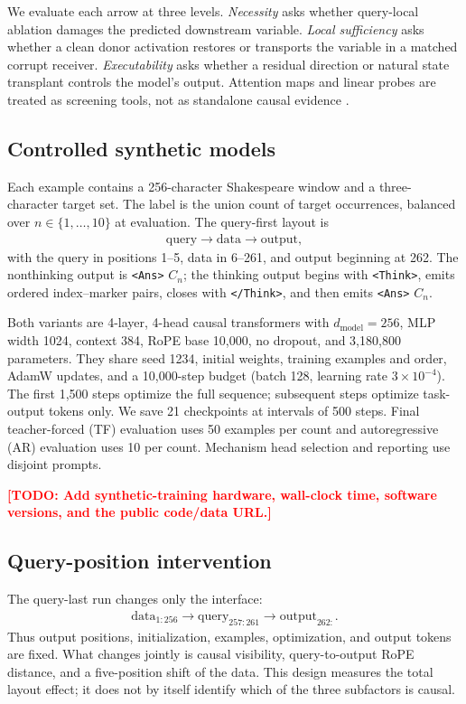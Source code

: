 \documentclass[11pt]{article}
\newcommand{\todo}[1]{\textcolor{red}{\textbf{[TODO: #1]}}}
\newcommand{\ans}{\texttt{<Ans>}}
\newcommand{\think}{\texttt{<Think>}}
\newcommand{\close}{\texttt{</Think>}}
\begin{document}
We evaluate each arrow at three levels. \emph{Necessity} asks whether query-local ablation damages the predicted downstream variable. \emph{Local sufficiency} asks whether a clean donor activation restores or transports the variable in a matched corrupt receiver. \emph{Executability} asks whether a residual direction or natural state transplant controls the model's output. Attention maps and linear probes are treated as screening tools, not as standalone causal evidence \citep{zhang2024patching}.

\subsection{Controlled synthetic models}

Each example contains a 256-character Shakespeare window and a three-character target set. The label is the union count of target occurrences, balanced over $n\in\{1,\ldots,10\}$ at evaluation. The query-first layout is
\begin{align*}
    \text{query} \rightarrow \text{data} \rightarrow \text{output},
\end{align*}
with the query in positions 1--5, data in 6--261, and output beginning at 262. The nonthinking output is \ans{} $C_n$; the thinking output begins with \think{}, emits ordered index--marker pairs, closes with \close{}, and then emits \ans{} $C_n$.

Both variants are 4-layer, 4-head causal transformers with $d_{\mathrm{model}}=256$, MLP width 1024, context 384, RoPE base 10,000, no dropout, and 3,180,800 parameters. They share seed 1234, initial weights, training examples and order, AdamW updates, and a 10,000-step budget (batch 128, learning rate $3\times10^{-4}$). The first 1,500 steps optimize the full sequence; subsequent steps optimize task-output tokens only. We save 21 checkpoints at intervals of 500 steps. Final teacher-forced (TF) evaluation uses 50 examples per count and autoregressive (AR) evaluation uses 10 per count. Mechanism head selection and reporting use disjoint prompts.

\todo{Add synthetic-training hardware, wall-clock time, software versions, and the public code/data URL.}

\subsection{Query-position intervention}

The query-last run changes only the interface:
\begin{align*}
    \text{data}_{1:256} \rightarrow \text{query}_{257:261} \rightarrow \text{output}_{262:}.
\end{align*}
Thus output positions, initialization, examples, optimization, and output tokens are fixed. What changes jointly is causal visibility, query-to-output RoPE distance, and a five-position shift of the data. This design measures the total layout effect; it does not by itself identify which of the three subfactors is causal.
\end{document}

